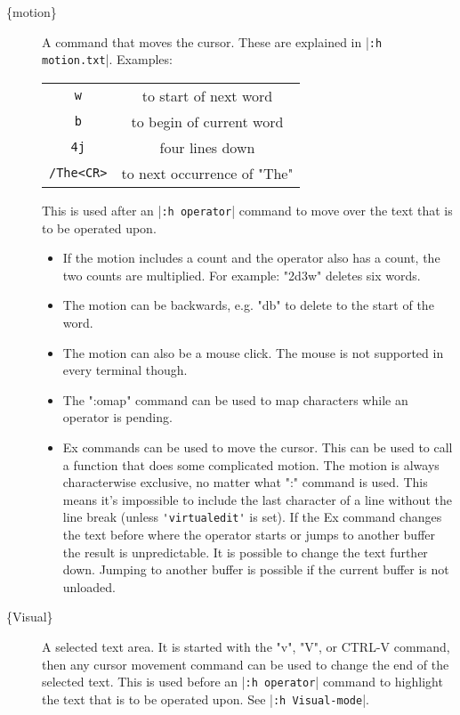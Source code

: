 \begin{description}
				\item[\{motion\}]
								\label{{motion}}
								\label{movement}
								A command that moves the cursor.
								These are explained in |\verb!:h motion.txt!|.
								Examples:
								\begin{center}
												\begin{tabular}{c c}
																\verb!w! & to start of next word\\
																\verb!b! & to begin of current word\\
																\verb!4j! & four lines down\\
												\verb!/The<CR>! & to next occurrence of "The"\\
												\end{tabular}
								\end{center}
								This is used after an |\verb!:h operator!| command to move over the text that is to be operated upon.
								\begin{itemize}
												\item If the motion includes a count and the operator also has a count, the two counts are multiplied.
																For example: "2d3w" deletes six words.
												\item The motion can be backwards, e.g. "db" to delete to the start of the word.
												\item The motion can also be a mouse click.
																The mouse is not supported in every terminal though.
												\item The ":omap" command can be used to map characters while an operator is pending.
												\item Ex commands can be used to move the cursor.
																This can be used to call a function that does some complicated motion.
																The motion is always characterwise exclusive, no matter what ":" command is used.
																This means it's impossible to include the last character of a line without the line break (unless \verb!'virtualedit'! is set).
																If the Ex command changes the text before where the operator starts or jumps to another buffer the result is unpredictable.
																It is possible to change the text further down.
																Jumping to another buffer is possible if the current buffer is not unloaded.
								\end{itemize}

				\item[\{Visual\}]
								\label{{Visual}}
								A selected text area.
								It is started with the "v", "V", or CTRL-V command, then any cursor movement command can be used to change the end of the selected text.
								This is used before an |\verb!:h operator!| command to highlight the text that is to be operated upon.
								See |\verb!:h Visual-mode!|.


\end{description}
